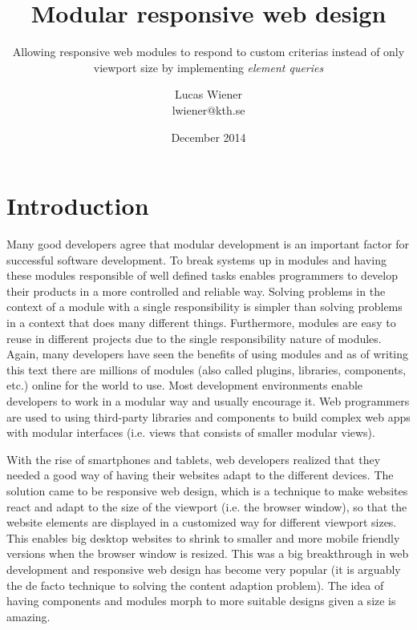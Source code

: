 \documentclass[oneside,a4paper,11pt]{kth-mag}
\title{Modular responsive web design}
\subtitle{Allowing responsive web modules to respond to custom criterias instead of only viewport size by implementing \emph{element queries}}
\author{Lucas Wiener \\ \lowercase{lwiener@kth.se}}
\date{December 2014}
\begin{document}
\frontmatter
\pagestyle{empty}
\removepagenumbers
\maketitle
\mainmatter
\section*{Introduction}

Many good developers agree that modular development is an important factor for successful software development. To break systems up in modules and having these modules responsible of well defined tasks enables programmers to develop their products in a more controlled and reliable way. Solving problems in the context of a module with a single responsibility is simpler than solving problems in a context that does many different things. Furthermore, modules are easy to reuse in different projects due to the single responsibility nature of modules. Again, many developers have seen the benefits of using modules and as of writing this text there are millions of modules (also called plugins, libraries, components, etc.) online for the world to use. Most development environments enable developers to work in a modular way and usually encourage it. Web programmers are used to using third-party libraries and components to build complex web apps with modular interfaces (i.e. views that consists of smaller modular views).

With the rise of smartphones and tablets, web developers realized that they needed a good way of having their websites adapt to the different devices. The solution came to be responsive web design, which is a technique to make websites react and adapt to the size of the viewport (i.e. the browser window), so that the website elements are displayed in a customized way for different viewport sizes. This enables big desktop websites to shrink to smaller and more mobile friendly versions when the browser window is resized. This was a big breakthrough in web development and responsive web design has become very popular (it is arguably the de facto technique to solving the content adaption problem). The idea of having components and modules morph to more suitable designs given a size is amazing.
\end{document}
